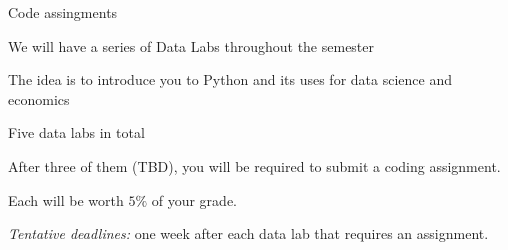 \documentclass[notes,11pt, aspectratio=169, xcolor=table]{beamer}
\newenvironment{wideitemize}{\itemize\addtolength{\itemsep}{10pt}}{\enditemize}
\begin{document}
\begin{frame}{Code assingments}

\begin{wideitemize}
    \item We will have a series of Data Labs throughout the semester
    \item<2-> The idea is to introduce you to Python and its uses for data science and economics 
    \item<3-> Five data labs in total
    \item<4-> After three of them (TBD), you will be required to submit a coding assignment. 
    \item<5-> Each will be worth $5\%$ of your grade.

\textit{Tentative deadlines:} one week after each data lab that requires an assignment.

\end{wideitemize}
 


    
\end{frame}
\end{document}
